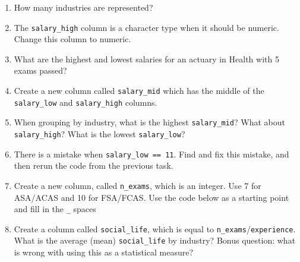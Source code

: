 \documentclass[openany]{book}
\newenvironment{Shaded}{\begin{snugshade}}{\end{snugshade}}
\newcommand{\DataTypeTok}[1]{\textcolor[rgb]{0.13,0.29,0.53}{#1}}
\newcommand{\KeywordTok}[1]{\textcolor[rgb]{0.13,0.29,0.53}{\textbf{#1}}}
\newcommand{\NormalTok}[1]{#1}
\newcommand{\OperatorTok}[1]{\textcolor[rgb]{0.81,0.36,0.00}{\textbf{#1}}}
\newcommand{\OtherTok}[1]{\textcolor[rgb]{0.56,0.35,0.01}{#1}}
\newcommand{\StringTok}[1]{\textcolor[rgb]{0.31,0.60,0.02}{#1}}
\providecommand{\tightlist}{%
  \setlength{\itemsep}{0pt}\setlength{\parskip}{0pt}}
\begin{document}
\begin{enumerate}
\def\labelenumi{\arabic{enumi}.}
\tightlist
\item
  How many industries are represented?
\item
  The \texttt{salary\_high} column is a character type when it should be numeric. Change this column to numeric.
\item
  What are the highest and lowest salaries for an actuary in Health with 5 exams passed?
\item
  Create a new column called \texttt{salary\_mid} which has the middle of the \texttt{salary\_low} and \texttt{salary\_high} columns.
\item
  When grouping by industry, what is the highest \texttt{salary\_mid}? What about \texttt{salary\_high}? What is the lowest \texttt{salary\_low}?
\item
  There is a mistake when \texttt{salary\_low\ ==\ 11}. Find and fix this mistake, and then rerun the code from the previous task.
\item
  Create a new column, called \texttt{n\_exams}, which is an integer. Use 7 for ASA/ACAS and 10 for FSA/FCAS. Use the code below as a starting point and fill in the \texttt{\_} spaces
\item
  Create a column called \texttt{social\_life}, which is equal to \texttt{n\_exams}/\texttt{experience}. What is the average (mean) \texttt{social\_life} by industry? Bonus question: what is wrong with using this as a statistical measure?
\end{enumerate}

\begin{Shaded}
\end{Shaded}
\end{document}
